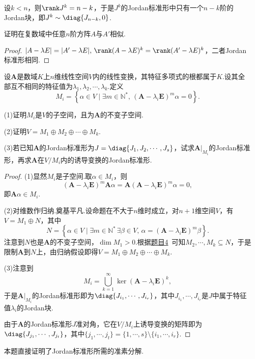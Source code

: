 \begin{sol}
	设$k<n$，则$\rank J^k=n-k$，于是$J^k$的Jordan标准形中只有一个$n-k$阶的Jordan块，即$J^k\sim\diag{J_{n-k},0}$.
\end{sol}
\begin{prob}[9]
	证明在复数域中任意$n$阶方阵$A$与$A'$相似.
\end{prob}
\begin{proof}
	$|A-\lambda E|=|A'-\lambda E|,\,\rank(A-\lambda E)^k=\rank(A'-\lambda E)^k$，二者Jordan标准形相同.
\end{proof}
\begin{prob}[10]
	设$\bm A$是数域$K$上$n$维线性空间$V$内的线性变换，其特征多项式的根都属于$K$.设其全部互不相同的特征值为$\lambda_1,\lambda_2,\cdots,\lambda_k$.定义
	\[
		M_i=\left\{\alpha\in V\mid \exists m\in\mathbb{N}^*,\,(\bm A-\lambda_i\bm E)^m\alpha=0\right\}.
	\]

	(1)证明$M_i$是$V$的子空间，且为$\bm A$的不变子空间.

	(2)证明$V=M_1\oplus M_2\oplus\cdots\oplus M_k$.

	(3)若已知$\bm A$的Jordan标准形为$J=\diag{J_1,J_2,\cdots,J_s}$，试求$\bm A|_{M_i}$的Jordan标准形，再求$\bm A$在$V/M_i$内的诱导变换的Jordan标准形.
\end{prob}
\begin{proof}
	(1)显然$M_i$是子空间.取$\alpha\in M_i$，则
	\[
		(\bm A-\lambda_i\bm E)^m\bm A\alpha=\bm A(\bm A-\lambda_i\bm E)^m\alpha=0,
	\]
	即$\bm A\alpha\in M_i$.

	(2)对维数作归纳.奠基平凡.设命题在不大于$n$维时成立，对$n+1$维空间$V$，有$V=M_1\oplus N$，其中
	\[
		N=\left\{\alpha\in V\mid \exists m\in\mathbb{N}^*\,\exists\beta\in V,\,\alpha=(\bm A-\lambda_i\bm E)^m\beta\right\}.
	\]
	注意到$N$也是$\bm A$的不变子空间，$\dim M_1>0$.根据\hyperlink{Tempdajdslka}{题目4}~可知$M_2,\cdots,M_k\subseteq N$，于是限制$\bm A$到$N$上，由归纳假设即得$V=M_1\oplus M_2\oplus\cdots\oplus M_k$.

	(3)注意到
	\[
		M_i=\bigcup_{k=1}^\infty\ker(\bm A-\lambda_i\bm E)^k,
	\]
	于是$\bm A|_{M_i}$的Jordan标准形即为$\diag{J_{i_1},\cdots,J_{i_r}}$，其中$J_{i_1},\cdots,J_{i_r}$是$J$中属于特征值$\lambda_i$的Jordan块.

	由于$\bm A$的Jordan标准形$J$准对角，它在$V/M_i$上诱导变换的矩阵即为$\diag{J_{j_1},\cdots,J_{j_t}}$，其中$\{j_1,\cdots,j_t\}=\{1,\cdots,s\}\setminus\{i_1,\cdots,i_r\}$.
\end{proof}
\begin{note}
	本题直接证明了Jordan标准形所需的准素分解.
\end{note}
